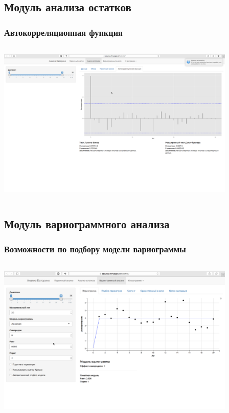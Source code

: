 \documentclass[10pt, pdf,aspectratio=169]{beamer}
\begin{document}
\subsection{Модуль анализа остатков}

\begin{frame}
  \frametitle{Автокорреляционная функция}   %
   \begin{columns}[c]
   \column{4.5in}
  \includegraphics[width=4.5in]{../../figures/static/3_acf.png}
  \end{columns}
\end{frame}

\subsection{Модуль вариограммного анализа}

\begin{frame}
  \frametitle{Возможности по подбору модели вариограммы}   %
   \begin{columns}[c]
   \column{4.5in}
  \includegraphics[width=4.5in]{../../figures/static/4_variogram.png}
  \end{columns}
\end{frame}
\end{document}
